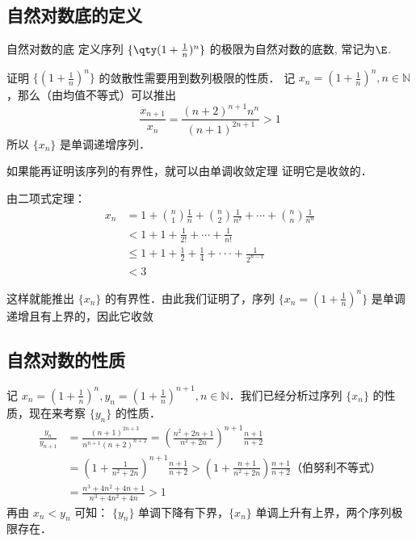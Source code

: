 

\subsection{自然对数底的定义}
\begin{definition}{自然对数的底}
定义序列 $\{\qty(1+\frac{1}{n})^n\}$ 的极限为自然对数的底数, 常记为$\E$.
\end{definition}
证明 $\{(1+\frac{1}{n})^n\}$ 的敛散性需要用到数列极限的性质．
记 $x_n=(1+\frac{1}{n})^n, n\in \mathbb{N}$，那么（由均值不等式）可以推出
\begin{equation}
  \frac{x_{n+1}}{x_n}=\frac{(n+2)^{n+1}n^{n}}{(n+1)^{2n+1}}>1
\end{equation}
所以 $\{x_n\}$ 是单调递增序列．

  如果能再证明该序列的有界性，就可以由单调收敛定理  证明它是收敛的．

由二项式定理：
\begin{equation}\label{exp_eq1}
\begin{aligned}
  x_n&=1+{n\choose 1}\frac{1}{n}+{n\choose 2}\frac{1}{n^2}+\cdots+{n\choose n}\frac{1}{n^n}\\
  &<1+1+\frac{1}{2!}+\cdots+\frac{1}{n!}\\
  &\leq1+1+\frac{1}{2}+\frac{1}{4}+\cdot\cdot\cdot+\frac{1}{2^{n-1}}\\
  &<3
\end{aligned}
\end{equation}

这样就能推出 $\{x_n\}$ 的有界性．由此我们证明了，序列 $\{x_n=(1+\frac{1}{n})^n\}$ 是单调递增且有上界的，因此它收敛

  
\subsection{自然对数的性质}
  记 $x_n=(1+\frac{1}{n})^n,y_n=(1+\frac{1}{n})^{n+1}, n\in \mathbb{N}$．我们已经分析过序列 $\{x_n\}$ 的性质，现在来考察 $\{y_n\}$ 的性质．
\begin{equation}
  \begin{aligned}
  \frac{y_n}{y_{n+1}}&=\frac{(n+1)^{2n+3}}{n^{n+1}(n+2)^{n+2}}=\left(\frac{n^2+2n+1}{n^2+2n}\right)^{n+1}\frac{n+1}{n+2}\\
  &=(1+\frac{1}{n^2+2n})^{n+1}\frac{n+1}{n+2}>\left(1+\frac{n+1}{n^2+2n}\right)\frac{n+1}{n+2} \text{（伯努利不等式）}\\
  &=\frac{n^3+4n^2+4n+1}{n^3+4n^2+4n}>1
  \end{aligned}
\end{equation}
  再由 $x_n<y_n$ 可知： $\{y_n\}$ 单调下降有下界，$\{x_n\}$ 单调上升有上界，两个序列极限存在．

